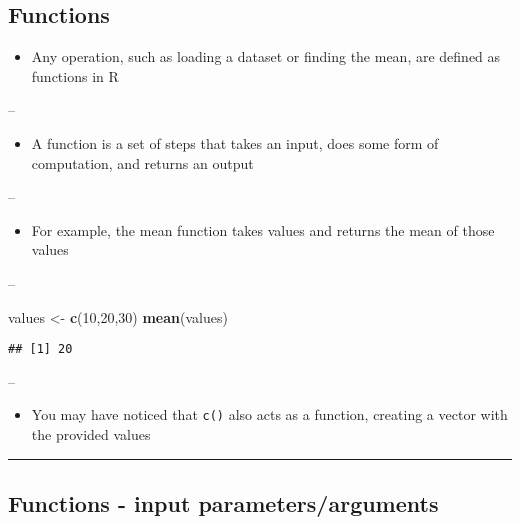 \documentclass[]{article}
\newenvironment{Shaded}{\begin{snugshade}}{\end{snugshade}}
\newcommand{\DecValTok}[1]{\textcolor[rgb]{0.00,0.00,0.81}{#1}}
\newcommand{\KeywordTok}[1]{\textcolor[rgb]{0.13,0.29,0.53}{\textbf{#1}}}
\newcommand{\NormalTok}[1]{#1}
\newcommand{\StringTok}[1]{\textcolor[rgb]{0.31,0.60,0.02}{#1}}
\providecommand{\tightlist}{%
  \setlength{\itemsep}{0pt}\setlength{\parskip}{0pt}}
\begin{document}
\hypertarget{functions}{%
\subsection{Functions}\label{functions}}

\begin{itemize}
\tightlist
\item
  Any operation, such as loading a dataset or finding the mean, are
  defined as functions in R
\end{itemize}

--

\begin{itemize}
\tightlist
\item
  A function is a set of steps that takes an input, does some form of
  computation, and returns an output
\end{itemize}

--

\begin{itemize}
\tightlist
\item
  For example, the mean function takes values and returns the mean of
  those values
\end{itemize}

--

\begin{Shaded}
\begin{Highlighting}[]
\NormalTok{values <-}\StringTok{ }\KeywordTok{c}\NormalTok{(}\DecValTok{10}\NormalTok{,}\DecValTok{20}\NormalTok{,}\DecValTok{30}\NormalTok{)}
\KeywordTok{mean}\NormalTok{(values)}
\end{Highlighting}
\end{Shaded}

\begin{verbatim}
## [1] 20
\end{verbatim}

--

\begin{itemize}
\tightlist
\item
  You may have noticed that \texttt{c()} also acts as a function,
  creating a vector with the provided values
\end{itemize}

\begin{center}\rule{0.5\linewidth}{\linethickness}\end{center}

\hypertarget{functions---input-parametersarguments}{%
\subsection{Functions - input
parameters/arguments}\label{functions---input-parametersarguments}}
\end{document}
